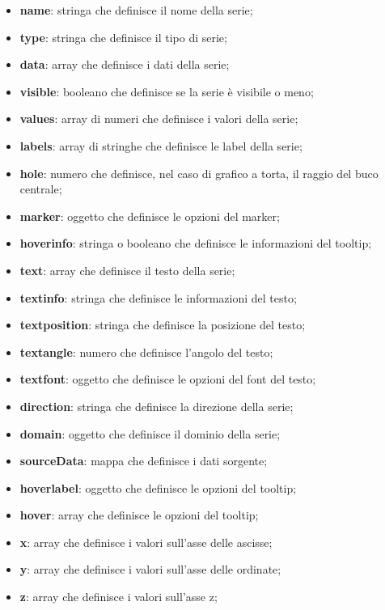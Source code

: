 \begin{itemize}
      \item \textbf{name}: stringa che definisce il nome della serie;
      \item \textbf{type}: stringa che definisce il tipo di serie;
      \item \textbf{data}: array che definisce i dati della serie;
      \item \textbf{visible}: booleano che definisce se la serie è visibile o meno;
      \item \textbf{values}: array di numeri che definisce i valori della serie;
      \item \textbf{labels}: array di stringhe che definisce le label della serie;
      \item \textbf{hole}: numero che definisce, nel caso di grafico a torta, il raggio del buco centrale;
      \item \textbf{marker}: oggetto che definisce le opzioni del marker;
      \item \textbf{hoverinfo}: stringa o booleano che definisce le informazioni del tooltip;
      \item \textbf{text}: array che definisce il testo della serie;
      \item \textbf{textinfo}: stringa che definisce le informazioni del testo;
      \item \textbf{textposition}: stringa che definisce la posizione del testo;
      \item \textbf{textangle}: numero che definisce l'angolo del testo;
      \item \textbf{textfont}: oggetto che definisce le opzioni del font del testo;
      \item \textbf{direction}: stringa che definisce la direzione della serie;
      \item \textbf{domain}: oggetto che definisce il dominio della serie;
      \item \textbf{sourceData}: mappa che definisce i dati sorgente;
      \item \textbf{hoverlabel}: oggetto che definisce le opzioni del tooltip;
      \item \textbf{hover}: array che definisce le opzioni del tooltip;
      \item \textbf{x}: array che definisce i valori sull'asse delle ascisse;
      \item \textbf{y}: array che definisce i valori sull'asse delle ordinate;
      \item \textbf{z}: array che definisce i valori sull'asse z;

\end{itemize}
